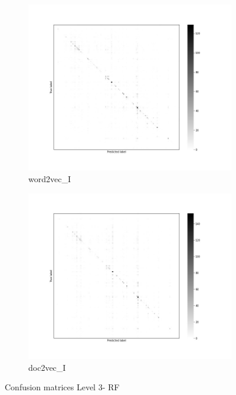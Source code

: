 \documentclass[12pt, a4paper, titlepage]{article}
\begin{document}
\begin{figure}
  \begin{subfigure}[b]{0.475\textwidth}   
    \centering 
    \includegraphics[width=\textwidth]{cm_word2vec_without_RF_3.jpg}
    {{\small word2vec\_I}}    
  \end{subfigure}
  \hfill
  \begin{subfigure}[b]{0.475\textwidth}   
      \centering 
      \includegraphics[width=\textwidth]{cm_doc2vec_without_RF_3.jpg}
      {{\small doc2vec\_I}}    
  \end{subfigure}
  \caption{\label{fig: F22} Confusion matrices Level 3- \ac{RF}}
\end{figure}
\end{document}
